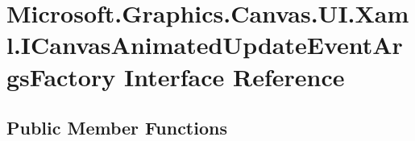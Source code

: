 \hypertarget{interface_microsoft_1_1_graphics_1_1_canvas_1_1_u_i_1_1_xaml_1_1_i_canvas_animated_update_event_args_factory}{}\section{Microsoft.\+Graphics.\+Canvas.\+U\+I.\+Xaml.\+I\+Canvas\+Animated\+Update\+Event\+Args\+Factory Interface Reference}
\label{interface_microsoft_1_1_graphics_1_1_canvas_1_1_u_i_1_1_xaml_1_1_i_canvas_animated_update_event_args_factory}
\subsection*{Public Member Functions}
